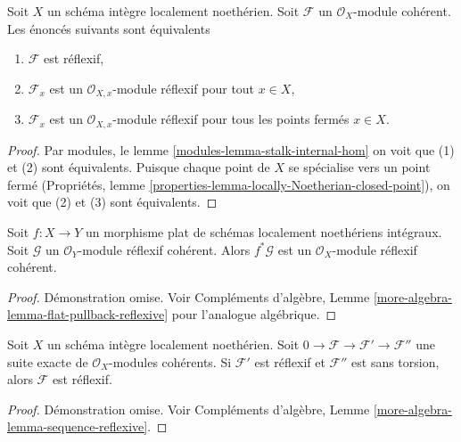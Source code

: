 \begin{lemma}
\label{lemma-check-reflexive}
Soit  $X$  un schéma intègre localement noethérien. Soit  $\mathcal{F}$  un
 $\mathcal{O}_X$-module cohérent. Les énoncés suivants sont équivalents
\begin{enumerate}
\item $\mathcal{F}$  est réflexif,
\item $\mathcal{F}_x$  est un  $\mathcal{O}_{X, x}$-module réflexif pour tout  $x \in X$,
\item $\mathcal{F}_x$  est un  $\mathcal{O}_{X, x}$-module réflexif pour tous les points fermés
 $x \in X$.
\end{enumerate}
\end{lemma}

\begin{proof}
Par modules, le lemme  \ref{modules-lemma-stalk-internal-hom}  on voit que (1) et (2) sont équivalents.
Puisque chaque point de  $X$  se spécialise vers un point fermé
(Propriétés, lemme  \ref{properties-lemma-locally-Noetherian-closed-point}), on voit que (2) et (3) sont équivalents.
\end{proof}

\begin{lemma}
\label{lemma-flat-pullback-reflexive}
Soit  $f : X \to Y$  un morphisme plat de schémas localement noethériens intégraux.
Soit  $\mathcal{G}$  un  $\mathcal{O}_Y$-module réflexif cohérent. Alors  $f^*\mathcal{G}$  est
un  $\mathcal{O}_X$-module réflexif cohérent.
\end{lemma}

\begin{proof}
Démonstration omise. Voir Compléments d'algèbre, Lemme  \ref{more-algebra-lemma-flat-pullback-reflexive}  pour l'analogue algébrique.
\end{proof}

\begin{lemma}
\label{lemma-sequence-reflexive}
Soit  $X$  un schéma intègre localement noethérien. Soit  $0 \to \mathcal{F} \to \mathcal{F}' \to \mathcal{F}''$  une
suite exacte de  $\mathcal{O}_X$-modules cohérents. Si  $\mathcal{F}'$  est réflexif et
 $\mathcal{F}''$  est sans torsion, alors  $\mathcal{F}$  est réflexif.
\end{lemma}

\begin{proof}
Démonstration omise. Voir Compléments d'algèbre, Lemme  \ref{more-algebra-lemma-sequence-reflexive}.
\end{proof}


